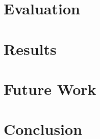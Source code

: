 \documentclass[conference]{IEEEtran}
\begin{document}
\section{Evaluation}

\section{Results}

\section{Future Work}

\section{Conclusion}





\appendix


\end{document}
